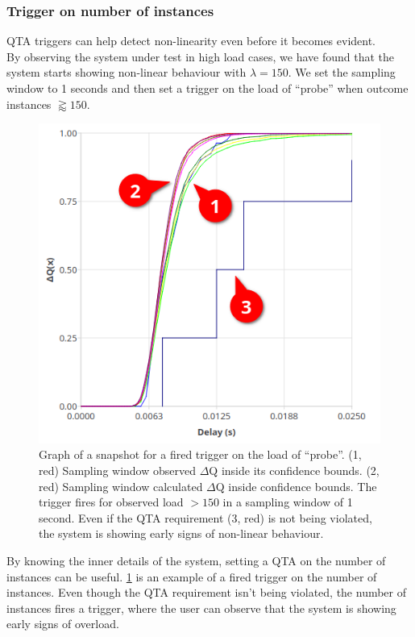         \subsubsection{Trigger on number of instances}
        QTA triggers can help detect non-linearity even before it becomes evident.\\ 
        By observing the system under test in high load cases, we have found that the system starts showing non-linear behaviour with $\lambda = 150$. We set the sampling window to 1 seconds and then set a trigger on the load of ``probe'' when outcome instances $\gtrapprox 150$.
        \begin{figure}[H]
            \begin{center}
                \includegraphics[scale=0.5]{img/overload_2/fired_samplea.png}
            \end{center}
            \caption{Graph of a snapshot for a fired trigger on the load of ``probe''. (1, red) Sampling window observed $\Delta$Q inside its confidence bounds. (2, red) Sampling window calculated $\Delta$Q inside confidence bounds. The trigger fires for observed load $> 150$ in a sampling window of 1 second. Even if the QTA requirement (3, red) is not being violated, the system is showing early signs of non-linear behaviour.}%
            \label{fig:qta_trig}%
        \end{figure} 
        By knowing the inner details of the system, setting a QTA on the number of instances can be useful. \cref{fig:qta_trig} is an example of a fired trigger on the number of instances. Even though the QTA requirement isn't being violated, the number of instances fires a trigger, where the user can observe that the system is showing early signs of overload.

